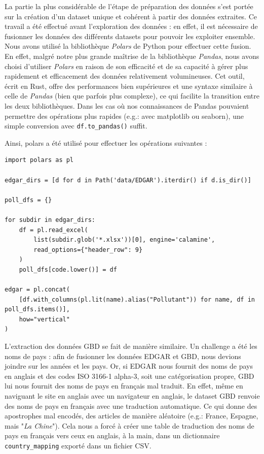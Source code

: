 \documentclass[11pt,a4paper]{article}
\begin{document}
La partie la plus considérable de l'étape de préparation des données s'est portée sur la création d'un dataset unique et cohérent à partir des données extraites. Ce travail a été effectué avant l'exploration des données : en effet, il est nécessaire de fusionner les données des différents datasets pour pouvoir les exploiter ensemble. Nous avons utilisé la bibliothèque \emph{Polars} de Python pour effectuer cette fusion. En effet, malgré notre plus grande maîtrise de la bibliothèque \emph{Pandas}, nous avons choisi d'utiliser \emph{Polars} en raison de son efficacité et de sa capacité à gérer plus rapidement et efficacement des données relativement volumineuses. Cet outil, écrit en Rust, offre des performances bien supérieures et une syntaxe similaire à celle de \emph{Pandas} (bien que parfois plus complexe), ce qui facilite la transition entre les deux bibliothèques. Dans les cas où nos connaissances de Pandas pouvaient permettre des opérations plus rapides (e.g.: avec matplotlib ou seaborn), une simple conversion avec \lstinline{df.to_pandas()} suffit.

Ainsi, polars a été utilisé pour effectuer les opérations suivantes :


\begin{listing}[H]
\caption{Extraction des données EDGAR avec Polars}
\label{lst:edgar_extraction}
\begin{lstlisting}[style=pythonstyle]
import polars as pl

edgar_dirs = [d for d in Path('data/EDGAR').iterdir() if d.is_dir()]

poll_dfs = {}

for subdir in edgar_dirs:
    df = pl.read_excel(
        list(subdir.glob('*.xlsx'))[0], engine='calamine',
        read_options={"header_row": 9}
    )
    poll_dfs[code.lower()] = df

edgar = pl.concat(
    [df.with_columns(pl.lit(name).alias("Pollutant")) for name, df in poll_dfs.items()],
    how="vertical"
)
\end{lstlisting}
\end{listing}

L'extraction des données GBD se fait de manière similaire. Un challenge a été les noms de pays : afin de fusionner les données EDGAR et GBD, nous devions joindre sur les années et les pays. Or, si EDGAR nous fournit des noms de pays en anglais et des codes ISO 3166-1 alpha-3, soit une catégorisation propre, GBD lui nous fournit des noms de pays en français mal traduit. En effet, même en naviguant le site en anglais avec un navigateur en anglais, le dataset GBD renvoie des noms de pays en français avec une traduction automatique. Ce qui donne des apostrophes mal encodés, des articles de manière aléatoire (e.g.: France, Espagne, mais "\textit{La Chine}"). Cela nous a forcé à créer une table de traduction des noms de pays en français vers ceux en anglais, à la main, dans un dictionnaire \lstinline{country_mapping} exporté dans un fichier CSV.
\end{document}
